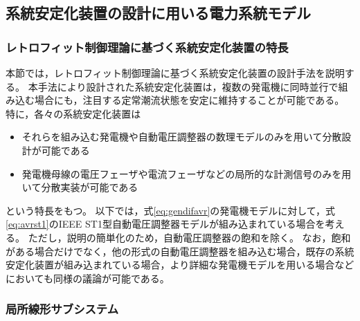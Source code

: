 \documentclass[tombow,dvipdfmx]{corona-a5-1.1}
\begin{document}
\subsection{系統安定化装置の設計に用いる電力系統モデル\advanced}

\smallskip
\subsubsection{レトロフィット制御理論に基づく系統安定化装置の特長}

本節では，レトロフィット制御理論に基づく系統安定化装置の設計手法を説明する\cite{ishizaki2018retrofit,sadamoto2018retrofit,sasahara2019damping,ishizaki2019retrofit,ishizaki2021modularity}。
本手法により設計された系統安定化装置は，複数の発電機に同時並行で組み込む場合にも，注目する定常潮流状態を安定に維持することが可能である。
特に，各々の系統安定化装置は
\begin{itemize}
\item それらを組み込む発電機や自動電圧調整器の数理モデルのみを用いて分散設計が可能である
\item 発電機母線の電圧フェーザや電流フェーザなどの局所的な計測信号のみを用いて分散実装が可能である
\end{itemize}
という特長をもつ。
以下では，式\ref{eq:gendifavr}の発電機モデルに対して，式\ref{eq:avrst1}のIEEE ST1型自動電圧調整器モデルが組み込まれている場合を考える。
ただし，説明の簡単化のため，自動電圧調整器の飽和を除く。
なお，飽和がある場合だけでなく，他の形式の自動電圧調整器を組み込む場合，既存の系統安定化装置が組み込まれている場合，より詳細な発電機モデルを用いる場合などにおいても同様の議論が可能である。


\smallskip
\subsubsection{局所線形サブシステム}
\end{document}
